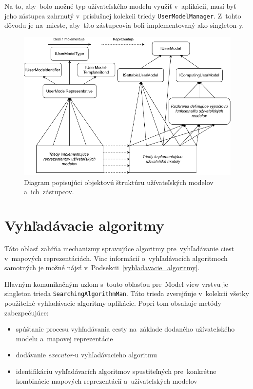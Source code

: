 Na to, aby~bolo možné typ užívateľského modelu využiť v~aplikácii, musí byť jeho zástupca zahrnutý v~príslušnej kolekcii triedy \texttt{UserModelManager}. Z~tohto dôvodu je na~mieste, aby~títo zástupcovia boli implementovaný ako singleton-y.

\begin{figure}[h]\centering
\includegraphics[]{img/uzivatelske_modely_architektura}
\caption{Diagram popisujúci objektovú štruktúru užívateľských modelov a~ich~zástupcov.} 
\label{obr08:uzivatelske_modely_architektura}
\end{figure}

\section{Vyhľadávacie algoritmy}

Táto oblasť zahŕňa mechanizmy spravujúce algoritmy pre~vyhľadávanie ciest v~mapových reprezentáciách. Viac informácií o~vyhľadávacích algoritmoch samotných je možné nájsť v~Podsekcii~\ref{vyhladavacie_algoritmy}. 

Hlavným komunikačným uzlom s~touto oblasťou pre~Model view vrstvu je singleton trieda \texttt{SearchingAlgorithmMan}. Táto trieda zverejňuje v~kolekcii všetky použiteľné vyhľadávacie algoritmy aplikácie. Popri tom obsahuje metódy zabezpečujúce: 
\begin{itemize}
    \item spúšťanie procesu vyhľadávania cesty na~základe dodaného užívateľského modelu a~mapovej reprezentácie
    \item dodávanie \textit{executor}-u vyhľadávacieho algoritmu
    \item identifikáciu vyhľadávacích algoritmov spustiteľných pre~konkrétne kombinácie mapových reprezentácií a~užívateľských modelov 
\end{itemize}

